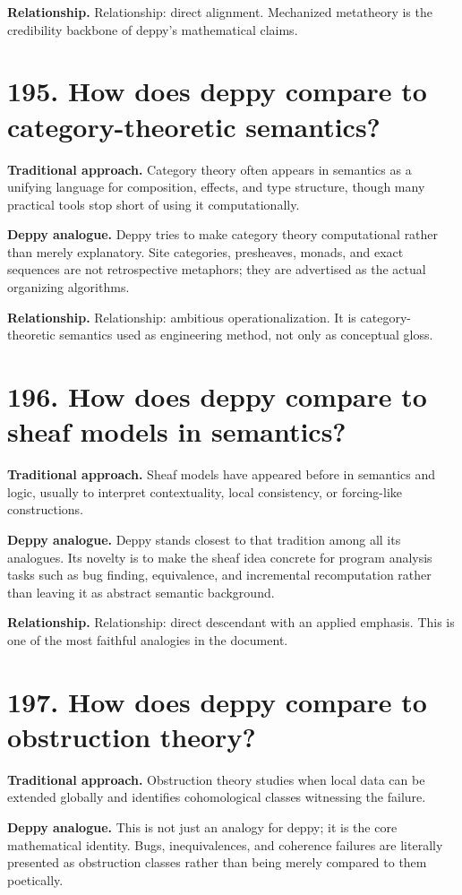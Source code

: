 \documentclass[11pt,openany]{book}
\begin{document}
\textbf{Relationship.} Relationship: direct alignment. Mechanized metatheory is the credibility backbone of deppy's mathematical claims.

\section*{195. How does deppy compare to category-theoretic semantics?}
\textbf{Traditional approach.} Category theory often appears in semantics as a unifying language for composition, effects, and type structure, though many practical tools stop short of using it computationally.

\textbf{Deppy analogue.} Deppy tries to make category theory computational rather than merely explanatory. Site categories, presheaves, monads, and exact sequences are not retrospective metaphors; they are advertised as the actual organizing algorithms.

\textbf{Relationship.} Relationship: ambitious operationalization. It is category-theoretic semantics used as engineering method, not only as conceptual gloss.

\section*{196. How does deppy compare to sheaf models in semantics?}
\textbf{Traditional approach.} Sheaf models have appeared before in semantics and logic, usually to interpret contextuality, local consistency, or forcing-like constructions.

\textbf{Deppy analogue.} Deppy stands closest to that tradition among all its analogues. Its novelty is to make the sheaf idea concrete for program analysis tasks such as bug finding, equivalence, and incremental recomputation rather than leaving it as abstract semantic background.

\textbf{Relationship.} Relationship: direct descendant with an applied emphasis. This is one of the most faithful analogies in the document.

\section*{197. How does deppy compare to obstruction theory?}
\textbf{Traditional approach.} Obstruction theory studies when local data can be extended globally and identifies cohomological classes witnessing the failure.

\textbf{Deppy analogue.} This is not just an analogy for deppy; it is the core mathematical identity. Bugs, inequivalences, and coherence failures are literally presented as obstruction classes rather than being merely compared to them poetically.
\end{document}
